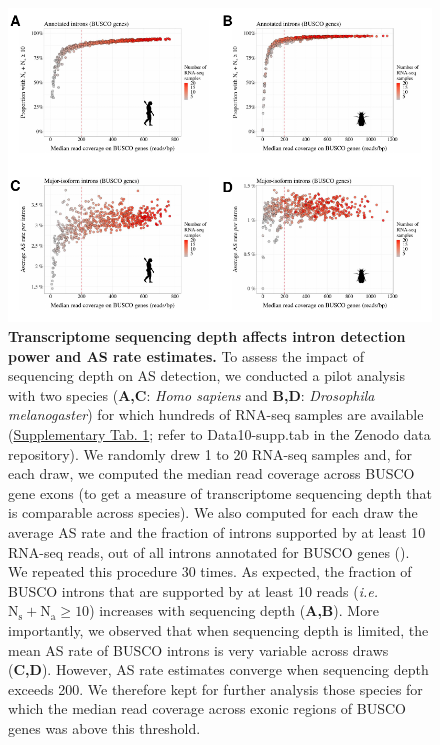 \begin{figure}[h]
    \begin{center}                                                                       
        \includegraphics[width=\textwidth] {Figure1_supp.pdf}
    \end{center}                                                                       
    \caption[Transcriptome sequencing depth affects intron detection power and AS rate estimates]{\textbf{Transcriptome sequencing depth affects intron detection power and AS rate estimates.} To assess the impact of sequencing depth on AS detection, we conducted a pilot analysis with two species (\textbf{A,C}: \textit{Homo sapiens} and \textbf{B,D}: \textit{Drosophila melanogaster}) for which hundreds of RNA-seq samples are available (\hyperref[table:1]{Supplementary Tab. 1}; refer to Data10-supp.tab in the Zenodo data repository). We randomly drew 1 to 20 RNA-seq samples and, for each draw, we computed the median read coverage across BUSCO gene exons (to get a measure of transcriptome sequencing depth that is comparable across species). We also computed for each draw the average AS rate and the fraction of introns supported by at least 10 RNA-seq reads, out of all introns annotated for BUSCO genes (). We repeated this procedure 30 times. As expected, the fraction of BUSCO introns that are supported by at least 10 reads (\textit{i.e.} $\mathrm{N_s+N_a}\geq10$) increases with sequencing depth (\textbf{A,B}). More importantly, we observed that when sequencing depth is limited, the mean AS rate of BUSCO introns is very variable across draws (\textbf{C,D}). However, AS rate estimates converge when sequencing depth exceeds 200. We therefore kept for further analysis those species for which the median read coverage across exonic regions of BUSCO genes was above this threshold.}
    \label{supp_fig:AS1}
\end{figure}
    

